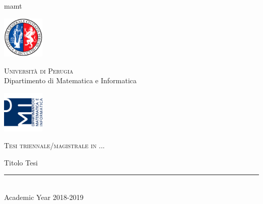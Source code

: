 mamt
\thispagestyle{empty} %

	\noindent %
	\includegraphics[width=0.15\textwidth]{img/logoUniPg}
	\begin{minipage}[b]{0.7\textwidth}
		\centering
		{\Large \textcolor{blu_dmi}{\textsc{Universit{\`a} di Perugia}}}\\
		\vspace{0.4 em}
		{\large \textcolor{blu_dmi}{Dipartimento di Matematica e Informatica}}
		\vspace{0.6 em}
	\end{minipage}%
	\includegraphics[width=0.15\textwidth]{img/logoDMI}
	
	\vspace{5 em}

	\begin{center}
		
		{\large \textcolor{blu_dmi}{\textsc{Tesi triennale/magistrale in ...}}}
		\vspace{8 em}
		
		{\Huge \textcolor{blu_dmi}{Titolo Tesi}}
		\vspace{10 em}
		
		
		\vspace{6 em}
		\vfill
		
		\textcolor{blu_dmi}{\rule{380pt}{.4pt}}\\
		\vspace{1.2 em}
		\large{\textcolor{blu_dmi}{Academic Year 2018-2019}}
		
		
		
		
	\end{center}

